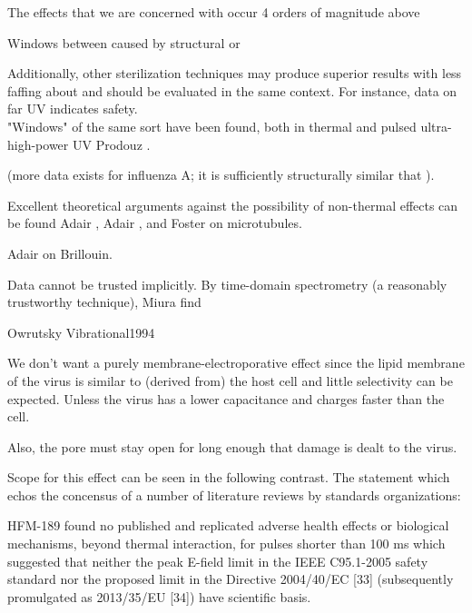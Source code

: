 \documentclass[paper.tex]{subfiles}
\begin{document}
\begin{multicols}{1}
The effects that we are concerned with occur 4 orders of magnitude above 

Windows between caused by structural or 

Additionally, other sterilization techniques may produce superior results with less faffing about and should be evaluated in the same context. For instance, data on far UV\cite{Germicidal2017} indicates safety.\\

"Windows" of the same sort have been found, both in thermal and pulsed ultra-high-power UV Prodouz \cite{Use1987a}.


(more data exists for influenza A; it is sufficiently structurally similar that ).



Excellent theoretical arguments against the possibility of non-thermal effects can be found Adair \cite{Vibrational2002}, Adair \cite{Biological2002}, and Foster \cite{Viscous2000} on microtubules. 



Adair \cite{Biophysics2000} on Brillouin.


Data cannot be trusted implicitly. By time-domain spectrometry (a reasonably trustworthy technique), Miura \cite{Microwave1994} find 


Owrutsky Vibrational1994




We don't want a purely membrane-electroporative effect since the lipid membrane of the virus is similar to (derived from) the host cell and little selectivity can be expected. Unless the virus has a lower capacitance and charges faster than the cell.

Also, the pore must stay open for long enough that damage is dealt to the virus. 



Scope for this effect can be seen in the following contrast. The statement which echos the concensus of a number of literature reviews by standards organizations:

\begin{fquote}
	HFM-189 found no published and replicated adverse health effects or biological mechanisms, beyond
	thermal interaction, for pulses shorter than 100 ms which suggested that neither the peak E-field limit in the
	IEEE C95.1-2005 safety standard {} nor the proposed limit in the Directive 2004/40/EC [33] (subsequently promulgated as 2013/35/EU [34]) have scientific basis. 
	

\end{fquote}
\end{multicols}
\end{document}
